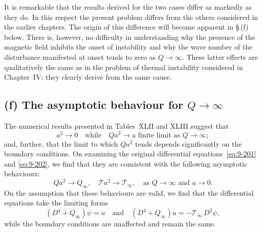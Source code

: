 
It is remarkable that the results derived for the two cases differ as markedly as they do. In this respect the present problem differs from the others considered in the earlier chapters. The origin of this difference will become apparent in \S\,(f) below. There is, however, no difficulty in understanding why the presence of the magnetic field inhibits the onset of instability and why the wave number of the disturbance manifested at onset tends to zero as $Q \to \infty$. These latter effects are qualitatively the same as in the problem of thermal instability considered in Chapter~IV: they clearly derive from the same cause.

\subsection*{(f) The asymptotic behaviour for $Q \to \infty$}

The numerical results presented in Tables~XLII and XLIII suggest that
\begin{equation}
a^2 \to 0 \quad \text{while} \quad Qa^2 \to \text{a finite limit as } Q \to \infty; \label{eq:9-257}
\end{equation}
and, further, that the limit to which $Qa^2$ tends depends significantly on the boundary conditions. On examining the original differential equations~\eqref{eq:9-201} and \eqref{eq:9-202}, we find that they are consistent with the following asymptotic behaviours:
\begin{equation}
Qa^2 \to Q_\infty, \quad \mathscr{T} a^2 \to \mathscr{T}_\infty, \quad \text{as } Q \to \infty \text{ and } a \to 0. \label{eq:9-258}
\end{equation}
On the assumption that these behaviours are valid, we find that the differential equations take the limiting forms
\begin{equation}
(D^4 + Q_\infty)\psi = u \quad \text{and} \quad (D^4 + Q_\infty)u = -\mathscr{T}_\infty\, D^2\psi, \label{eq:9-259}
\end{equation}
while the boundary conditions are unaffected and remain the same.

